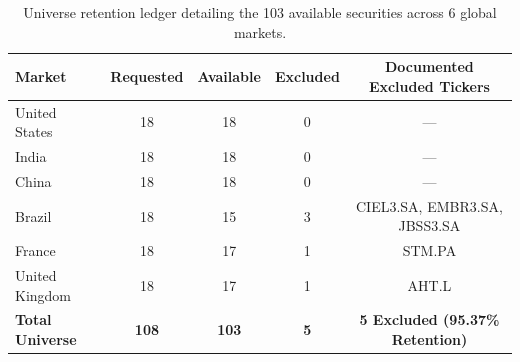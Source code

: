 \begin{table}[ht]
\centering
\small
\begin{tabular}{lcccc}
\toprule
\textbf{Market} & \textbf{Requested} & \textbf{Available} & \textbf{Excluded} & \textbf{Documented Excluded Tickers} \\
\midrule
United States & 18 & 18 & 0 & --- \\
India & 18 & 18 & 0 & --- \\
China & 18 & 18 & 0 & --- \\
Brazil & 18 & 15 & 3 & CIEL3.SA, EMBR3.SA, JBSS3.SA \\
France & 18 & 17 & 1 & STM.PA \\
United Kingdom & 18 & 17 & 1 & AHT.L \\
\midrule
\textbf{Total Universe} & \textbf{108} & \textbf{103} & \textbf{5} & \textbf{5 Excluded (95.37\% Retention)} \\
\bottomrule
\end{tabular}
\caption{Universe retention ledger detailing the 103 available securities across 6 global markets.}
\label{tab:universe_retention}
\end{table}
